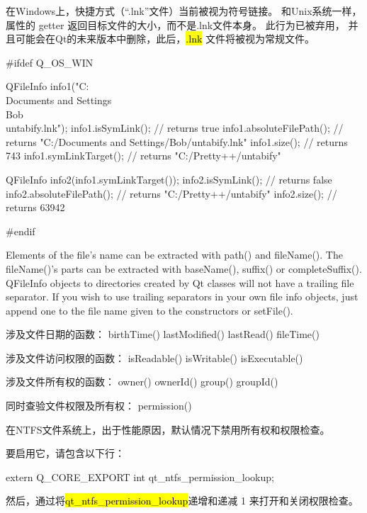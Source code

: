 在Windows上，快捷方式（“.lnk”文件）当前被视为符号链接。 和Unix系统一样，
属性的 getter 返回目标文件的大小，而不是.lnk文件本身。 此行为已被弃用，
并且可能会在Qt的未来版本中删除，此后，\hl{.lnk} 文件将被视为常规文件。

\begin{cppcode}
#ifdef Q_OS_WIN

QFileInfo info1("C:\\Documents and Settings\\Bob\\untabify.lnk");
info1.isSymLink();          // returns true
info1.absoluteFilePath();   // returns "C:/Documents and Settings/Bob/untabify.lnk"
info1.size();               // returns 743
info1.symLinkTarget();      // returns "C:/Pretty++/untabify"

QFileInfo info2(info1.symLinkTarget());
info2.isSymLink();          // returns false
info2.absoluteFilePath();   // returns "C:/Pretty++/untabify"
info2.size();               // returns 63942

#endif
\end{cppcode}

Elements of the file's name can be extracted with path() and fileName(). The fileName()'s parts can be extracted with baseName(), suffix() or completeSuffix(). QFileInfo objects to directories created by Qt classes will not have a trailing file separator. If you wish to use trailing separators in your own file info objects, just append one to the file name given to the constructors or setFile().

涉及文件日期的函数： birthTime() lastModified() lastRead() fileTime()

涉及文件访问权限的函数： isReadable() isWritable() isExecutable()

涉及文件所有权的函数： owner() ownerId() group() groupId()

同时查验文件权限及所有权： permission()

\begin{notice}
在NTFS文件系统上，出于性能原因，默认情况下禁用所有权和权限检查。
\end{notice}


要启用它，请包含以下行：

\begin{cppcode}
extern Q_CORE_EXPORT int qt_ntfs_permission_lookup;
\end{cppcode}

然后，通过将\hl{qt\_ntfs\_permission\_lookup}递增和递减 1 来打开和关闭权限检查。

